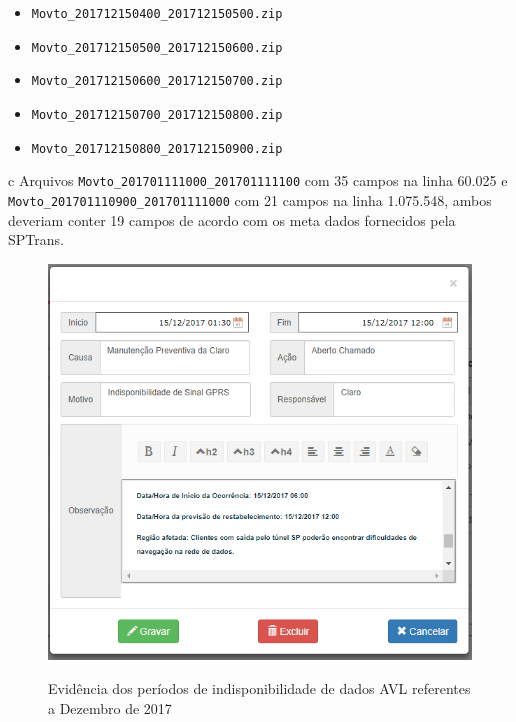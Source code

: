 \documentclass[
	12pt,				%
	oneside,			%
	a4paper,			%
	english,			%
	brazil				%
	]{abntex2ppgsi}
\begin{document}
\begin{table}[!htb]
\begin{threeparttable}
\begin{tablenotes}
\begin{itemize}
\item \texttt{Movto\_201712150400\_201712150500.zip}
\item \texttt{Movto\_201712150500\_201712150600.zip}
\item \texttt{Movto\_201712150600\_201712150700.zip}
\item \texttt{Movto\_201712150700\_201712150800.zip}
\item \texttt{Movto\_201712150800\_201712150900.zip}
\end{itemize}
\item[c] Arquivos  \texttt{Movto\_201701111000\_201701111100} com 35 campos na linha 60.025 e \texttt{Movto\_201701110900\_201701111000} com 21 campos na linha 1.075.548, ambos deveriam conter 19 campos de acordo com os meta dados fornecidos pela SPTrans.
\end{tablenotes}
\end{threeparttable}
\end{table}

\begin{figure}[!htb]%
	\centering
 	  \caption{Evidência dos períodos de indisponibilidade de dados AVL referentes a Dezembro de 2017}
		\includegraphics[width=0.5\linewidth]{images/33310_ANEXO_E_SIC_33310.png}
	\label{fig:e_sic_33310}
\end{figure}
\end{document}
